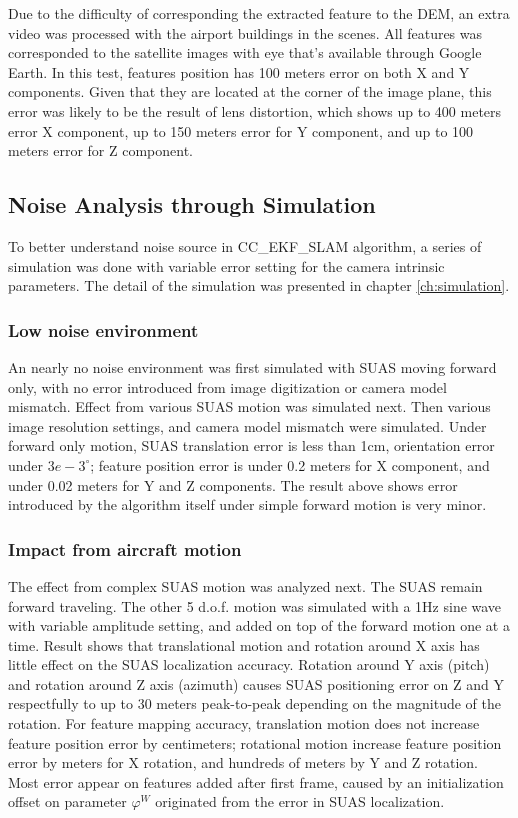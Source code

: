 Due to the difficulty of corresponding the extracted feature to the
DEM, an extra video was processed with the airport buildings in the
scenes. All features was corresponded to the satellite images with eye
that's available through Google Earth. In this test, features position
has 100 meters error on both X and Y components. Given that they are
located at the corner of the image plane, this error was likely to be
the result of lens distortion, which shows up to 400 meters error X
component, up to 150 meters error for Y component, and up to 100
meters error for Z component. 

\subsection{Noise Analysis through Simulation}
To better understand noise source in CC\_EKF\_SLAM algorithm, a series
of simulation was done with variable error setting for the camera
intrinsic parameters. The detail of the simulation was presented in
chapter \ref{ch:simulation}. 

\subsubsection{Low noise environment}
An nearly no noise environment was first simulated with SUAS moving
forward only, with no error introduced from image digitization or
camera model mismatch. Effect from various SUAS motion was simulated
next. Then various image resolution settings, and camera model
mismatch were simulated. Under forward only motion, SUAS translation
error is less than 1cm, orientation error under $3e-3^\circ$; feature
position error is under 0.2 meters for X component, and under 0.02
meters for Y and Z components. The result above shows error introduced
by the algorithm itself under simple forward motion is very minor.

\subsubsection{Impact from aircraft motion}
The effect from complex SUAS motion was analyzed next. The SUAS remain
forward traveling. The other 5 d.o.f. motion was simulated with a 1Hz
sine wave with variable amplitude setting, and added on top of the
forward motion one at a time. Result shows that translational motion
and rotation around X axis has little effect on the SUAS localization
accuracy. Rotation around Y axis (pitch) and rotation around Z axis
(azimuth) causes SUAS positioning error on Z and Y respectfully to up
to 30 meters peak-to-peak depending on the magnitude of the rotation.
For feature mapping accuracy, translation motion does not increase
feature position error by centimeters; rotational motion increase
feature position error by meters for X rotation, and hundreds of
meters by Y and Z rotation. Most error appear on features added after
first frame, caused by an initialization offset on parameter
$\varphi^W$ originated from the error in SUAS localization.

